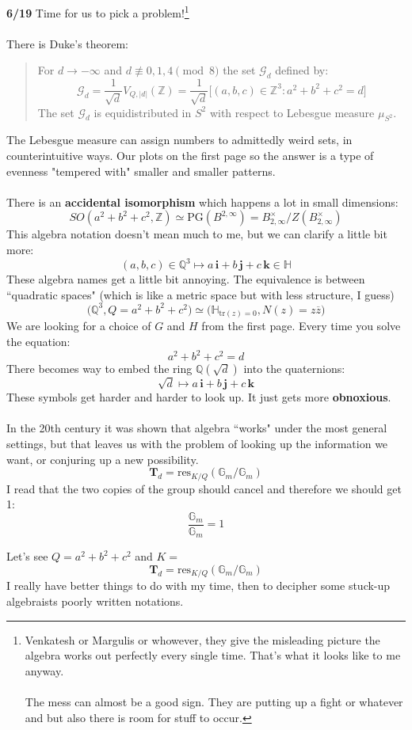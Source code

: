 \documentclass[12pt]{article}
\begin{document}
\newpage

\noindent \textbf{6/19}  Time for us to pick a problem!\footnote{Venkatesh or Margulis or whowever, they give the misleading picture the algebra works out perfectly every single time.  That's what it looks like to me anyway.  \\ \\
The mess can almost be a good sign.  They are putting up a fight or whatever and but also there is room for stuff to occur.} \\ \\
There is Duke's theorem:
\begin{quotation}
\noindent For $d \to -\infty$ and $d \not \equiv 0,1,4 \pmod 8 $ the set $\mathcal{G}_d$ defined by:
$$ \mathcal{G}_d = \frac{1}{\sqrt{d}} V_{Q, |d|}(\mathbb{Z})   = \frac{1}{\sqrt{d}} 
\bigg[ (a,b,c)\in \mathbb{Z}^3: a^2 + b^2 + c^2 = d \bigg] $$
The set $\mathcal{G}_d$ is equidistributed in $S^2$ with respect to Lebesgue measure $\mu_{S^2}$.
\end{quotation}
The Lebesgue measure can assign numbers to admittedly weird sets, in counterintuitive ways.  Our plots on the first page so the answer is a type of evenness "tempered with" smaller and smaller patterns.  \\ \\
There is an \textbf{accidental isomorphism} which happens a lot in small dimensions:
$$ SO( a^2 + b^2 + c^2, \mathbb{Z}) \simeq \mathrm{PG}(B^{2, \infty})
= B^\times_{2, \infty}/ Z(B^\times_{2, \infty}) $$
This algebra notation doesn't mean much to me, but we can clarify a little bit more:
$$ (a,b,c) \in \mathbb{Q}^3 \mapsto a\,\mathbf{i} + b\,\mathbf{j} + c\,\mathbf{k} \in \mathbb{H} $$
These algebra names get a little bit annoying.  The equivalence is between  ``quadratic spaces" (which is like a metric space but with less structure, I guess)
$$ \big(\mathbb{Q}^3, Q = a^2 + b^2 + c^2 \big) \simeq \big(\mathbb{H}_{\mathrm{tr}(z) = 0} , N(z) = z \overline{z} \big) $$
We are looking for a choice of $G$ and $H$ from the first page.  Every time you solve the equation:
$$  a^2 + b^2 + c^2 = d$$
There becomes  way to embed the ring $\mathbb{Q}(\sqrt{d})$ into the quaternions:
$$ \sqrt{d} \mapsto a\,\mathbf{i} + b\,\mathbf{j} + c\,\mathbf{k}  $$
These symbols get harder and harder to look up.  It just gets more \textbf{obnoxious}. \\ \\
In the 20th century it was shown that algebra ``works" under the most general settings, but that leaves us with the problem of looking up the information we want, or conjuring up a new possibility. 
$$ \mathbf{T}_d = \mathrm{res}_{K/Q} (\mathbb{G}_m / \mathbb{G}_m ) $$
I read that the two copies of the group should cancel and therefore we should get 1:
$$ \frac{\mathbb{G}_m }{\mathbb{G}_m } = 1 $$

\newpage

\noindent Let's see $Q = a^2 + b^2 + c^2$ and $K = $
$$ \mathbf{T}_d = \mathrm{res}_{K/Q} (\mathbb{G}_m / \mathbb{G}_m ) $$
I really have better things to do with my time, then to decipher some stuck-up algebraists poorly written notations.
\end{document}

